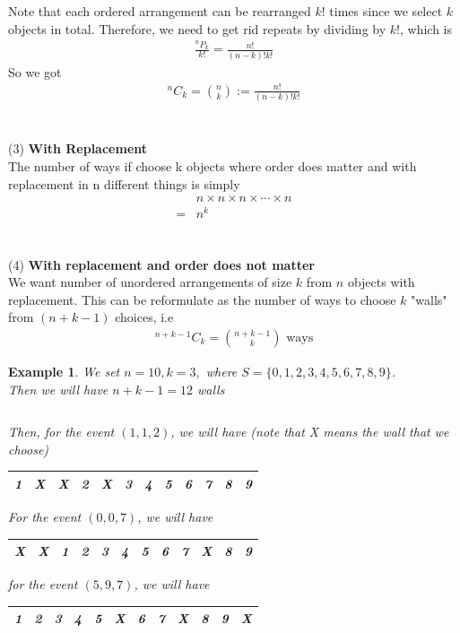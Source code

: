 \documentclass[11pt,oneside]{book}
\theoremstyle{newStyle}
\newtheorem{ex}{Example}[section]
\newcommand*{\Perm}[2]{{}^{#1}\!P_{#2}}
\newcommand*{\Comb}[2]{{}^{#1}C_{#2}}
\begin{document}
Note that each ordered arrangement can be rearranged $k!$ times since we select $k$ objects in total. Therefore, we need to get rid repeats by dividing by $k!$, which is \begin{align*}
\frac{\Perm{n}{k}}{k!}=\frac{n!}{(n-k)!k!}
\end{align*}
So we got\begin{align*}
\Comb{n}{k}=\binom nk:=\frac{n!}{(n-k)!k!}
\end{align*}
\hfill\\
\hfill\\
(3) \textbf{With Replacement}\\
The number of ways if choose k objects where order does matter and with replacement in n different things is simply \begin{align*}
&n\times n \times n \times \cdots\times n \\
=&n^k
\end{align*}
\hfill\\
\hfill\\
(4) \textbf{ With replacement and order does not matter}\\
We want number of unordered arrangements of size $k$ from $n$ objects with replacement. This can be reformulate as the number of ways to choose $k$ "walls" from $(n+k-1)$ choices, i.e \begin{align*}
\Comb{n+k-1}{k}=\binom{n+k-1}{k} \text{ ways}
\end{align*} 
\begin{ex}
We set $n=10,k=3,$ where $S=\{0,1,2,3,4,5,6,7,8,9\}$.\\
Then we will have $n+k-1=12$ walls \begin{center}
 \begin{tabular}{|l|l|l|l|l|l|l|l|l|l|l|l|}
\hline
 &  &  &  &  &  &  &  &  &  &  &  \\ \hline
\end{tabular}
\end{center}
Then, for the event $(1,1,2)$, we will have (note that X means the wall that we choose) \begin{center}
\begin{tabular}{|l|l|l|l|l|l|l|l|l|l|l|l|}
\hline
 1 & X & X & 2 & X & 3 & 4 & 5 & 6 & 7 & 8 & 9  \\ \hline
\end{tabular}
\end{center}
For the event $(0,0,7)$, we will have \begin{center}
\begin{tabular}{|l|l|l|l|l|l|l|l|l|l|l|l|}
\hline
 X & X & 1 & 2 & 3 & 4 & 5 & 6 & 7 & X&8 & 9  \\ \hline
\end{tabular}
\end{center}
for the event $(5,9,7)$, we will have \begin{center}
\begin{tabular}{|l|l|l|l|l|l|l|l|l|l|l|l|}
\hline
 1  & 2  & 3 & 4 & 5&X & 6 & 7 &X& 8 & 9&X  \\ \hline
\end{tabular}
\end{center}
\end{ex}
\hfill\\
\end{document}
